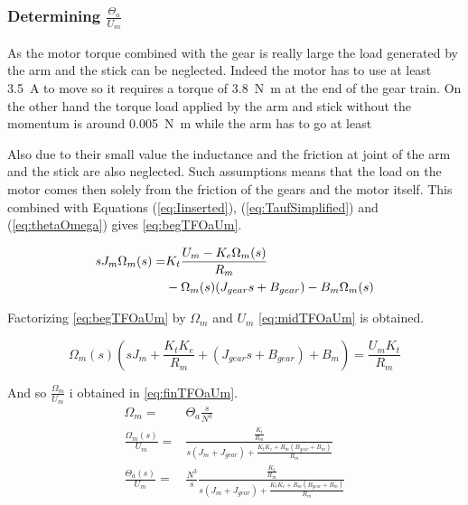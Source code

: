 \subsubsection{Determining $\frac{\Theta_a}{U_m}$}


As the motor torque combined with the gear is really large the load generated by the arm and the stick can be neglected. Indeed the motor has to use at least \SI{3.5}{\ampere} to move so it requires a torque of \SI{3.8}{\newton\meter} at the end of the gear train. On the other hand the torque load applied by the arm and stick without the momentum is around \SI{0.005}{\newton\meter} while the arm has to go at least 

Also due to their small value the inductance and the friction at joint of the arm and the stick are also neglected. Such assumptions means that the load on the motor comes then solely from the friction of the gears and the motor itself. This combined with Equations (\ref{eq:Iinserted}), (\ref{eq:TaufSimplified}) and (\ref{eq:thetaOmega}) gives \autoref{eq:begTFOaUm}.


\begin{align}\label{eq:begTFOaUm}
	s J_{m} \Omega_m(s) = &K_{t} \frac{U_m-K_e \Omega_m(s)}{R_m} \notag \\ 
	&- \Omega_m(s) (J_{gear}s+B_{gear}) - B_{m} \Omega_m(s) \addunit{1}
\end{align}

Factorizing \autoref{eq:begTFOaUm} by $\Omega_m$ and $U_m$ \autoref{eq:midTFOaUm} is obtained.

\begin{equation}\label{eq:midTFOaUm}
	\Omega_m(s)\left(s J_m+\frac{K_t K_e}{ R_m} + (J_{gear}s+B_{gear}) + B_{m}  \right)=\frac{U_m K_t}{R_m}	
\end{equation}

And so $\frac{\Omega_m}{U_m}$ i obtained in \autoref{eq:finTFOaUm}.
\begin{subequations}\label{eq:finTFOaUm}
	\begin{align}
		\Omega_m=&\Theta_a\frac{s}{N^3}\\
		\frac{\Omega_m(s)}{U_m}=&\frac{\frac{ K_t}{R_m}}{s(J_m+J_{gear})+\frac{K_t K_e +R_m (B_{gear}+B_m)}{R_m}} \\
		\frac{\Theta_a(s)}{U_m}=&\frac{N^3}{s}\frac{\frac{ K_t}{R_m}}{s(J_m+J_{gear})+\frac{K_t K_e +R_m (B_{gear}+B_m)}{R_m}}
	\end{align}
\end{subequations}